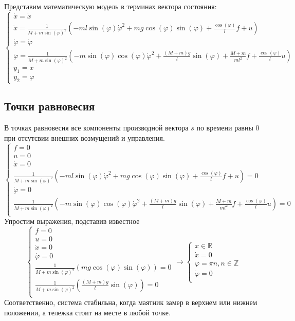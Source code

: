 Представим математическую модель в терминах вектора состояния:
\begin{equation} \label{eq:7}
  \begin{cases}
      \dot x = \dot x \\
      \ddot x = \frac{1}{M + m\sin(\varphi)^2}( -ml\sin(\varphi)\dot{\varphi}^2 + mg\cos(\varphi)\sin(\varphi) + \frac{\cos(\varphi)}{l}f + u ) \\
      \dot \varphi = \dot \varphi \\
      \ddot \varphi= \frac{1}{M + m\sin(\varphi)^2}( -m\sin(\varphi)\cos(\varphi)\dot{\varphi}^2 + \frac{(M+m)g}{l}\sin(\varphi) + \frac{M+m}{ml^2}f + \frac{\cos(\varphi)}{l}u ) \\
      y_1 = x \\
      y_2 = \varphi
  \end{cases}
\end{equation}

\FloatBarrier
\subsection{Точки равновесия}
В точках равновесия все компоненты производной вектора \(s\) по времени равны $0$ при отсутсвии внешних возмущений и управления.
\[
  \begin{cases}
    f = 0 \\
    u = 0 \\
    \dot x = 0\\
    \frac{1}{M + m\sin(\varphi)^2}( -ml\sin(\varphi)\dot{\varphi}^2 + mg\cos(\varphi)\sin(\varphi) + \frac{\cos(\varphi)}{l}f + u ) = 0\\
    \dot \varphi = 0\\
    \frac{1}{M + m\sin(\varphi)^2}( -m\sin(\varphi)\cos(\varphi)\dot{\varphi}^2 + \frac{(M+m)g}{l}\sin(\varphi) + \frac{M+m}{ml^2}f + \frac{\cos(\varphi)}{l}u ) = 0\\
  \end{cases}
\]
Упростим выражения, подставив известное
\[
  \begin{cases}
    f = 0 \\
    u = 0 \\
    \dot x = 0\\
    \dot \varphi = 0\\
    \frac{1}{M + m\sin(\varphi)^2}(mg\cos(\varphi)\sin(\varphi)) = 0\\
    \frac{1}{M + m\sin(\varphi)^2}(\frac{(M+m)g}{l}\sin(\varphi)) = 0\\
  \end{cases} \rightarrow
  \begin{cases}
    x \in \mathds{R} \\
    \dot x = 0\\
    \varphi = \pi n, n \in \mathds{Z}\\
    \dot \varphi = 0\\
  \end{cases}
\]
Соответственно, система стабильна, когда маятник замер в верхнем или нижнем положении, а тележка стоит на месте в любой точке.

